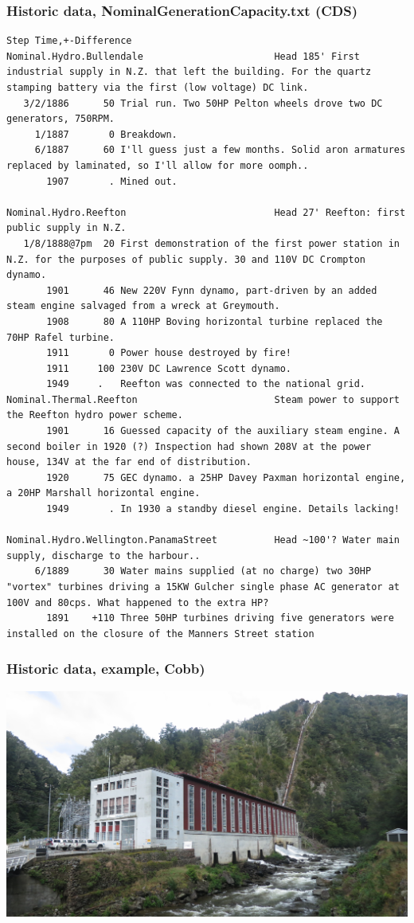 \documentclass[aspectratio=169]{beamer}
\begin{document}
\begin{frame}[fragile]
  \frametitle{Historic data, NominalGenerationCapacity.txt (CDS)}
  \scriptsize
  \begin{verbatim}
Step Time,+-Difference
Nominal.Hydro.Bullendale                       Head 185' First industrial supply in N.Z. that left the building. For the quartz stamping battery via the first (low voltage) DC link.
   3/2/1886      50 Trial run. Two 50HP Pelton wheels drove two DC generators, 750RPM.
     1/1887       0 Breakdown.
     6/1887      60 I'll guess just a few months. Solid aron armatures replaced by laminated, so I'll allow for more oomph..
       1907       . Mined out.

Nominal.Hydro.Reefton                          Head 27' Reefton: first public supply in N.Z.
   1/8/1888@7pm  20 First demonstration of the first power station in N.Z. for the purposes of public supply. 30 and 110V DC Crompton dynamo.
       1901      46 New 220V Fynn dynamo, part-driven by an added steam engine salvaged from a wreck at Greymouth.
       1908      80 A 110HP Boving horizontal turbine replaced the 70HP Rafel turbine.
       1911       0 Power house destroyed by fire!
       1911     100 230V DC Lawrence Scott dynamo.
       1949     .   Reefton was connected to the national grid.
Nominal.Thermal.Reefton                        Steam power to support the Reefton hydro power scheme.
       1901      16 Guessed capacity of the auxiliary steam engine. A second boiler in 1920 (?) Inspection had shown 208V at the power house, 134V at the far end of distribution.
       1920      75 GEC dynamo. a 25HP Davey Paxman horizontal engine, a 20HP Marshall horizontal engine.
       1949       . In 1930 a standby diesel engine. Details lacking!

Nominal.Hydro.Wellington.PanamaStreet          Head ~100'? Water main supply, discharge to the harbour..
     6/1889      30 Water mains supplied (at no charge) two 30HP "vortex" turbines driving a 15KW Gulcher single phase AC generator at 100V and 80cps. What happened to the extra HP?
       1891    +110 Three 50HP turbines driving five generators were installed on the closure of the Manners Street station

  \end{verbatim}
\end{frame}


\frame
{\frametitle{Historic data, example, Cobb)}
\begin{center}
\includegraphics[height=7.5cm]{cobb.jpg} 
\end{center}
}
\end{document}
